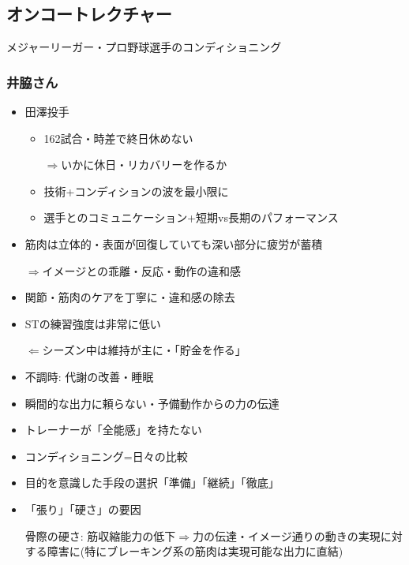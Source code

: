 \documentclass[dvipdfmx, 10.5pt]{jsarticle}
\begin{document}
\subsection{オンコートレクチャー}

メジャーリーガー・プロ野球選手のコンディショニング

\subsubsection{井脇さん}

\begin{itemize}
  \item 田澤投手
  \begin{itemize}
    \item 162試合・時差で終日休めない

    $\Rightarrow$いかに休日・リカバリーを作るか

    \item 技術+コンディションの波を最小限に

    \item 選手とのコミュニケーション+短期vs長期のパフォーマンス
  \end{itemize}

  \item 筋肉は立体的・表面が回復していても深い部分に疲労が蓄積

  $\Rightarrow$イメージとの乖離・反応・動作の違和感

  \item 関節・筋肉のケアを丁寧に・違和感の除去

  \item STの練習強度は非常に低い

  $\Leftarrow$シーズン中は維持が主に・「貯金を作る」

  \item 不調時: 代謝の改善・睡眠

  \item 瞬間的な出力に頼らない・予備動作からの力の伝達

  \item トレーナーが「全能感」を持たない

  \item コンディショニング=日々の比較

  \item 目的を意識した手段の選択「準備」「継続」「徹底」

  \item 「張り」「硬さ」の要因

  骨際の硬さ: 筋収縮能力の低下$\Rightarrow$力の伝達・イメージ通りの動きの実現に対する障害に(特にブレーキング系の筋肉は実現可能な出力に直結)


\end{itemize}
\end{document}
